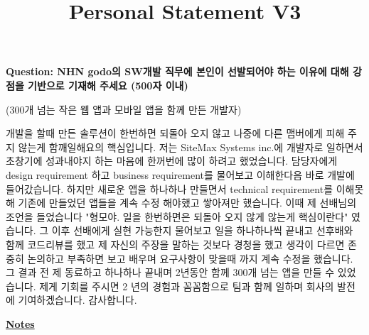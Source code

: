 \documentclass[12pt]{article}
\begin{document}
\title{Personal Statement V3}
\maketitle

\textbf{Question: NHN godo의 SW개발 직무에 본인이 선발되어야 하는 이유에 대해 강점을 기반으로 기재해 주세요 (500자 이내)}

\bigskip

(300개 넘는 작은 웹 앱과 모바일 앱을 함께 만든 개발자)

\bigskip

개발을 할때 만든 솔루션이 한번하면 되돌아 오지 않고 나중에 다른 맴버에게 피해 주지 않는게 함깨일해요의 핵심입니다.
저는 SiteMax Systems inc.에 개발자로 일하면서 초창기에 성과내야지 하는 마음에 한꺼번에 많이 하려고 했었습니다.
담당자에게 design requirement 하고 business requirement를 물어보고 이해한다음 바로 개발에 들어갔습니다.
하지만 새로운 앱을 하나하나 만들면서 technical requirement를 이해못해 기존에 만들었던 앱들을 계속 수정 해야했고 쌓아져만 했습니다.
이때 제 선배님의 조언을 들었습니다 "형모야. 일을 한번하면은 되돌아 오지 않게 않는게 핵심이란다" 였습니다.
그 이후 선배에게 실현 가능한지 물어보고 일을 하나하나씩 끝내고 선후배와 함께 코드리뷰를 했고 제 자신의 주장을 말하는 것보다 경청을 했고 생각이 다르면 존중히 논의하고 부족하면 보고 배우며 요구사항이 맞을때 까지 계속 수정을 했습니다.
그 결과 전 제 동료하고 하나하나 끝내며 2년동안 함께 300개 넘는 앱을 만들 수 있었습니다.
제게 기회를 주시면 2 년의 경험과 꼼꼼함으로 팀과 함께 일하며 회사의 발전에 기여하겠습니다. 감사합니다.


\underline{\textbf{Notes}}
\end{document}
